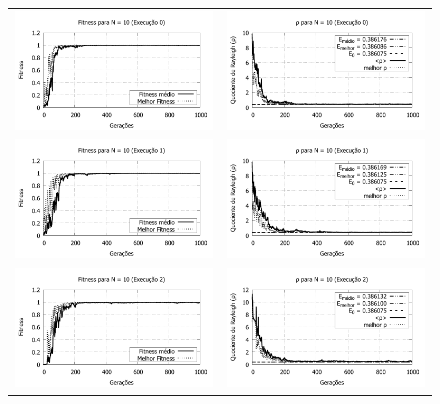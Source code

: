 \begin{figure}[p]
	\centering
  \begin{tabular}{@{}cc@{}}
    \includegraphics[width=.40\textwidth]{figs/resultados/fitnessEL/N-10_E-0_fitness-extendido.pdf} &
    \includegraphics[width=.40\textwidth]{figs/resultados/fitnessEL/N-10_E-0_rho_extendido.pdf}   \\
		\includegraphics[width=.40\textwidth]{figs/resultados/fitnessEL/N-10_E-1_fitness-extendido.pdf} &
    \includegraphics[width=.40\textwidth]{figs/resultados/fitnessEL/N-10_E-1_rho_extendido.pdf}   \\
		\includegraphics[width=.40\textwidth]{figs/resultados/fitnessEL/N-10_E-2_fitness-extendido.pdf} &
    \includegraphics[width=.40\textwidth]{figs/resultados/fitnessEL/N-10_E-2_rho_extendido.pdf}   \\

\end{tabular}
\end{figure}
